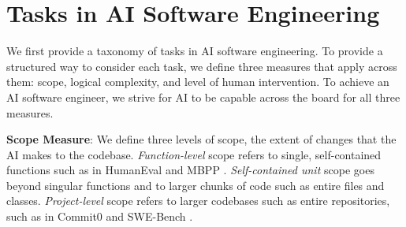 \section{Tasks in AI Software Engineering} \label{sec:main-tasks-milestones}
We first provide a taxonomy of tasks in AI software engineering. To provide a structured way to consider each task, we define three measures that apply across them: scope, logical complexity, and level of human intervention. To achieve an AI software engineer, we strive for AI to be capable across the board for all three measures.

\textbf{Scope Measure}: We define three levels of scope, the extent of changes that the AI makes to the codebase. \textit{Function-level} scope refers to single, self-contained functions such as in HumanEval \citep{chen2021evaluating} and MBPP \citep{austin2021program}. \textit{Self-contained unit} scope goes beyond singular functions and to larger chunks of code such as entire files and classes. \textit{Project-level} scope refers to larger codebases such as entire repositories, such as in Commit0 \citep{zhao2024commit0} and SWE-Bench \citep{jimenez2024swebench}.


